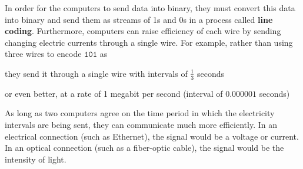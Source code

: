 \documentclass[a4paper, 12pt]{report}
\theoremstyle{remark}
\theoremstyle{definition}
\begin{document}
In order for the computers to send data into binary, they must convert this data into binary and send them as streams of 1s and 0s in a process called \textbf{line coding}. Furthermore, computers can raise efficiency of each wire by sending changing electric currents through a single wire. For example, rather than using three wires to encode $\texttt{101}$ as 
\begin{center}
\end{center}
they send it through a single wire with intervals of $\frac{1}{3}$ seconds
\begin{center}
\end{center}
or even better, at a rate of 1 megabit per second (interval of $0.000001$ seconds)
\begin{center}
\end{center}

As long as two computers agree on the time period in which the electricity intervals are being sent, they can communicate much more efficiently. In an electrical connection (such as Ethernet), the signal would be a voltage or current. In an optical connection (such as a fiber-optic cable), the signal would be the intensity of light. 
\end{document}
